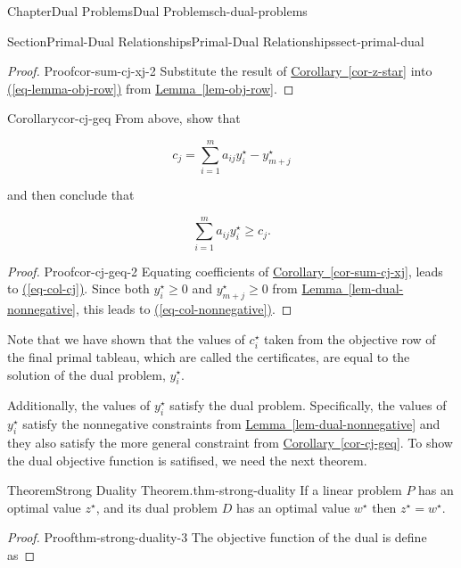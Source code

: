 \documentclass[oneside,10pt,]{book}
\newcommand{\xreffont}{\relax}
\numberwithin{equation}{section}
\begin{document}
\begin{chapterptx}{Chapter}{Dual Problems}{}{Dual Problems}{}{}{ch-dual-problems}
\begin{sectionptx}{Section}{Primal-Dual Relationships}{}{Primal-Dual Relationships}{}{}{sect-primal-dual}
\begin{proof}{Proof}{}{cor-sum-cj-xj-2}
Substitute the result of \hyperref[cor-z-star]{Corollary~{\xreffont\ref{cor-z-star}}} into \hyperref[eq-lemma-obj-row]{({\xreffont\ref{eq-lemma-obj-row}})} from  \hyperref[lem-obj-row]{Lemma~{\xreffont\ref{lem-obj-row}}}.%
\end{proof}
\begin{corollary}{Corollary}{}{}{cor-cj-geq}%
From above, show that%
\par
%
\begin{equation}
c_j = \sum_{i=1}^m a_{ij} y^{\star}_i - y^{\star}_{m+j}\label{eq-col-cj}
\end{equation}
%
\par
and then conclude that%
\par
%
\begin{equation}
\sum_{i=1}^m a_{ij} y^{\star}_i \geq c_j.\label{eq-col-nonnegative}
\end{equation}
%
\end{corollary}
\begin{proof}{Proof}{}{cor-cj-geq-2}
Equating coefficients of \hyperref[cor-sum-cj-xj]{Corollary~{\xreffont\ref{cor-sum-cj-xj}}}, leads to \hyperref[eq-col-cj]{({\xreffont\ref{eq-col-cj}})}. Since both \(y^{\star}_i \geq 0\) and  \(y^{\star}_{m+j} \geq 0\) from \hyperref[lem-dual-nonnegative]{Lemma~{\xreffont\ref{lem-dual-nonnegative}}}, this leads to \hyperref[eq-col-nonnegative]{({\xreffont\ref{eq-col-nonnegative}})}.%
\end{proof}
Note that we have shown that the values of \(c_{i}^{\star}\) taken from the objective row of the final primal tableau, which are called the certificates, are equal to the solution of the dual problem, \(y_i^{\star}\).%
\par
Additionally, the values of \(y_{i}^{\star}\) satisfy the dual problem.  Specifically, the values of \(y_{i}^{\star}\) satisfy the nonnegative constraints from \hyperref[lem-dual-nonnegative]{Lemma~{\xreffont\ref{lem-dual-nonnegative}}} and they also satisfy the more general constraint from \hyperref[cor-cj-geq]{Corollary~{\xreffont\ref{cor-cj-geq}}}.  To show the dual objective function is satifised, we need the next theorem.%
\begin{theorem}{Theorem}{Strong Duality Theorem.}{}{thm-strong-duality}%
If a linear problem \(P\) has an optimal value \(z^{\star}\), and its dual problem \(D\) has an optimal value \(w^{\star}\) then \(z^{\star}=w^{\star}\).%
\end{theorem}
\begin{proof}{Proof}{}{thm-strong-duality-3}
The objective function of the dual is define as%

\end{proof}
\end{sectionptx}
\end{chapterptx}
\end{document}
